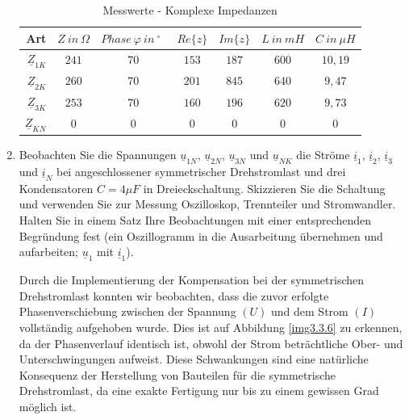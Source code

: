 \begin{enumerate}[label=\alph*)]
	 			\begin{table}[h]
          \begin{center}
            \caption{Messwerte - Komplexe Impedanzen}
	 				\begin{tabular}{r c c c c c c}
	 					\hline
	 					Art & \( Z\ in\ \Omega\) & \( Phase\ \varphi\ in\ ^\circ\ \ \)  & \( Re{\{z\}} \) & \( Im{\{z\}} \) & \( L\ in\ mH \) & \( C\ in\ \mu H \) \\
	 					\hline
	 					$\underline{Z}_{1K}$ & \( 241 \) & \( 70 \)	& \( 153 \) & \( 187 \) & \( 600 \)	& \( 10,19 \)\\
	 					$\underline{Z}_{2K}$ & \( 260 \) & \( 70 \)	& \( 201 \) & \( 845 \) & \( 640 \)	& \( 9,47 \)\\
	 					$\underline{Z}_{3K}$ & \( 253 \) & \( 70 \)	& \( 160 \) & \( 196 \) & \( 620 \)	& \( 9,73 \)\\
	 					$\underline{Z}_{KN}$ & \( 0   \) & \( 0 \)	& \( 0   \) & \( 0 \)	& \( 0 \)	& \( 0 \)\\
	 					\hline
	 				\end{tabular}
        \end{center}
	 			\end{table}
	 		
	 		
	 		
	 		\item Beobachten Sie die Spannungen $\underline{u}_{1N}$, $\underline{u}_{2N}$, $\underline{u}_{3N}$ und $\underline{u}_{NK}$ die Ströme $\underline{i}_{1}$, $\underline{i}_{2}$, $\underline{i}_{3}$ und $\underline{i}_{N}$ bei angeschlossener symmetrischer Drehstromlast und drei Kondensatoren $C = 4 \mu F$ in Dreieckschaltung.  Skizzieren Sie die Schaltung und verwenden Sie zur Messung Oszilloskop, Trennteiler und Stromwandler. Halten Sie in einem Satz Ihre Beobachtungen mit einer entsprechenden Begründung fest (ein Oszillogramm in die Ausarbeitung übernehmen und aufarbeiten; $\underline{u}_{1}$ mit $\underline{i}_{1}$).
	 		
	 		Durch die Implementierung der Kompensation bei der symmetrischen Drehstromlast konnten wir beobachten, dass die zuvor erfolgte Phasenverschiebung zwischen der Spannung $(U)$ und dem Strom $(I)$ vollständig aufgehoben wurde. Dies ist auf Abbildung \ref{img3.3.6} zu erkennen, da der Phasenverlauf identisch ist, obwohl der Strom beträchtliche Ober- und Unterschwingungen aufweist. Diese Schwankungen sind eine natürliche Konsequenz der Herstellung von Bauteilen für die symmetrische Drehstromlast, da eine exakte Fertigung nur bis zu einem gewissen Grad möglich ist.
	 		

\end{enumerate}
